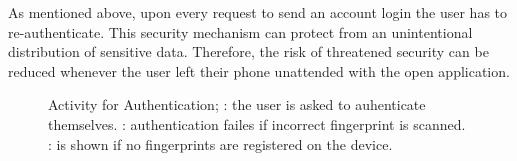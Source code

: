 As mentioned above, upon every request to send an account login the user has to re-authenticate. This security mechanism can protect from an unintentional distribution of sensitive data. Therefore, the risk of threatened security can be reduced whenever the user left their phone unattended with the open application. \\

\begin{figure}[!htb]
\centering
{}
\qquad
{}
\qquad
{}
\caption[Activity for Authentication]{Activity for Authentication; \protect{}: the user is asked to auhenticate themselves. \protect{}: authentication failes if incorrect fingerprint is scanned. \protect{}: is shown if no fingerprints are registered on the device.}
\label{fig:authentication}
\end{figure}

